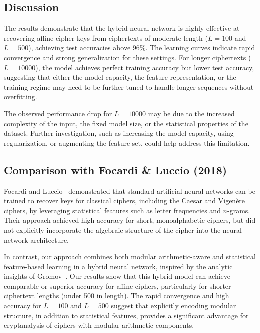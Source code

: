 \documentclass[manuscript,screen,acmtog,natbib=false]{acmart}
\begin{document}
  \subsection{Discussion}

  The results demonstrate that the hybrid neural network is highly effective at recovering affine cipher keys from ciphertexts of moderate length
  ($L=100$ and $L=500$), achieving test accuracies above 96\%. The learning curves indicate rapid convergence and strong generalization for these settings. 
  For longer ciphertexts ($L=10000$), the model achieves perfect training accuracy but lower test accuracy, suggesting that either the model capacity, the feature
  representation, or the training regime may need to be further tuned to handle longer sequences without overfitting.

  The observed performance drop for $L=10000$ may be due to the increased complexity of the input, the fixed model size, or the statistical properties of the dataset.
  Further investigation, such as increasing the model capacity, using regularization, or augmenting the feature set, could help address this limitation.

  \subsection{Comparison with Focardi \& Luccio (2018)}

  Focardi and Luccio~\cite{Focardi2018NeuralCO} demonstrated that standard artificial neural networks can be trained to recover keys for classical ciphers, including
  the Caesar and Vigenère ciphers, by leveraging statistical features such as letter frequencies and $n$-grams. Their approach achieved high accuracy for short, monoalphabetic
  ciphers, but did not explicitly incorporate the algebraic structure of the cipher into the neural network architecture.

  In contrast, our approach combines both modular arithmetic-aware and statistical feature-based learning in a hybrid neural network, inspired by the analytic insights of Gromov~\cite{gromov2023}.
  Our results show that this hybrid model can achieve comparable or superior accuracy for affine ciphers, particularly for shorter ciphertext lengths (under 500 in length). The rapid convergence and high accuracy for $L=100$ and $L=500$
  suggest that explicitly encoding modular structure, in addition to statistical features, provides a significant advantage for cryptanalysis of ciphers with modular arithmetic components.
\end{document}
